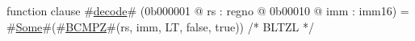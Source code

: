 function clause #\hyperref[zdecode]{decode}# (0b000001 @ rs : regno @ 0b00010 @ imm : imm16) =
  #\hyperref[zSome]{Some}#(#\hyperref[zBCMPZ]{BCMPZ}#(rs, imm, LT, false, true))  /* BLTZL */
